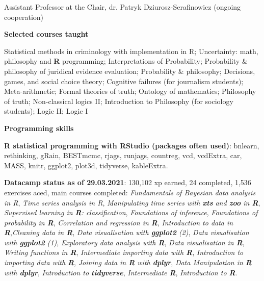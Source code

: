 \documentclass[10pt, a4paper]{article}
\newcommand{\years}[1]{\marginnote{\normalsize #1}}
\begin{document}
\years{2017-  } Assistant Professor at the Chair, dr. Patryk Dziurosz-Serafinowicz (ongoing cooperation)


\vspace{2mm}




\large
 {\sc \textbf{Selected courses taught}}
\normalsize

Statistical methods in criminology with implementation in \textsf{R}; Uncertainty: math, philosophy and \textbf{\textsf{R}} programming; Interpretations of Probability; Probability \& philosophy of juridical evidence evaluation; Probability \& philosophy; Decisions, games, and social choice theory; Cognitive failures (for journalism students); Meta-arithmetic; Formal theories of truth; Ontology of mathematics; Philosophy of truth; Non-classical logics II; Introduction to Philosophy (for sociology students); Logic II; Logic I






\vspace{2mm}





\large
 {\sc \textbf{Programming skills}}
\normalsize

\textbf{\textsf{R} statistical programming with \textsf{RStudio} (packages often used)}: \textsf{bnlearn, rethinking, gRain, BESTmcmc, rjags, runjags, countreg,  vcd, vcdExtra, car, MASS, knitr, ggplot2,  plot3d, tidyverse, kableExtra.}

\textbf{Datacamp status as of 29.03.2021}:   130,102 xp earned, 24 completed, 1,536 exercises aced, main courses completed: \emph{Fundamentals of Bayesian data analysis in R}, \emph{Time series analysis in R}, \emph{Manipulating time series with \textsf{\textbf{xts}} and \textsf{\textbf{zoo}} in \textsf{\textbf{R}}},
\emph{Supervised learning in \textsf{\textbf{R}}: classification}, \emph{Foundations of inference}, \emph{Foundations of probability in \textsf{\textbf{R}}},
\emph{Correlation and regression in \textsf{\textbf{R}}}, \emph{Introduction to data in \textsf{\textbf{R}}},\emph{Cleaning data in \textsf{\textbf{R}}},
 \emph{Data visualisation with \textsf{\textbf{ggplot2}} (2)},
  \emph{Data visualisation with \textsf{\textbf{ggplot2}} (1)}, \emph{Exploratory data analysis with \textsf{\textbf{R}}},  \emph{Data visualisation in \textsf{\textbf{R}}}, \emph{Writing functions in \textsf{\textbf{R}}}, \emph{Intermediate importing data with \textsf{\textbf{R}}}, \emph{Introduction to importing data with \textsf{\textbf{R}}}, \emph{Joining data in \textsf{\textbf{R}} with \textsf{\textbf{dplyr}}}, \emph{Data Manipulation in \textsf{\textbf{R}} with \textsf{\textbf{dplyr}}}, \emph{Introduction to \textsf{\textbf{tidyverse}}}, \emph{Intermediate \textsf{\textbf{R}}}, \emph{Introduction to \textsf{\textbf{R}}}.
\end{document}
